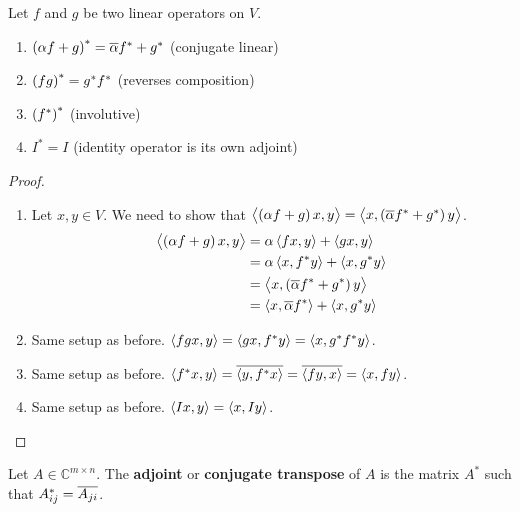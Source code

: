 \begin{theorem}
  Let \(f\) and \(g\) be two linear operators on \(V\).
  \begin{enumerate}
    \item \(\del{\alpha f + g}^* = \conj{\alpha}f^* + g^*\) (conjugate linear)
    \item \(\del{fg}^* = g^* f^*\) (reverses composition)
    \item \(\del{f^*}^*\) (involutive)
    \item \(I^* = I\) (identity operator is its own adjoint)
  \end{enumerate}
\end{theorem}
\begin{proof}
  \begin{enumerate}
    \item
    Let \(x,y\in V\).
    We need to show that
    \(\innerprod{\del{\alpha f + g} x}{y}
    = \innerprod{x}{\del{\conj{\alpha} f^* + g^*} y}\).
    \begin{align}
      \innerprod{\del{\alpha f + g} x}{y}
      &= \alpha \innerprod{fx}{y} + \innerprod{gx}{y}\\
      &= \alpha \innerprod{x}{f^*y} + \innerprod{x}{g^*y}\\
      &= \innerprod{x}{\del{\conj{\alpha} f^* + g^*} y}\\
      &= \innerprod{x}{\conj{\alpha}f^*} + \innerprod{x}{g^*y}\\
    \end{align}

    \item
    Same setup as before.
    \(\left\langle fg x, y\right\rangle = \left\langle gx, f^*y\right\rangle = \left\langle x, g^*f^*y\right\rangle\).

    \item
    Same setup as before.
    \(\left\langle f^* x, y\right\rangle = \overline{\left\langle y, f^*x\right\rangle} = \overline{\left\langle fy, x\right\rangle} = \left\langle x, fy\right\rangle\).

    \item
    Same setup as before.
    \(\left\langle Ix, y\right\rangle = \left\langle x, Iy\right\rangle\).
  \end{enumerate}
\end{proof}

\begin{definition}
  Let \(A \in \mathbb{C}^{m \times n}\).
  The \textbf{adjoint} or \textbf{conjugate transpose} of \(A\)
  is the matrix \(A^*\) such that \(A^*_{ij} = \overline{A_{ji}}\).
\end{definition}


